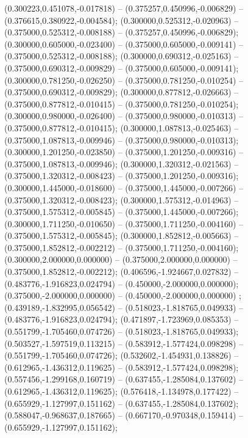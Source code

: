  (0.300223,0.451078,-0.017818) -- (0.375257,0.450996,-0.006829) -- (0.376615,0.380922,-0.004584);
 (0.300000,0.525312,-0.020963) -- (0.375000,0.525312,-0.008188) -- (0.375257,0.450996,-0.006829);
 (0.300000,0.605000,-0.023400) -- (0.375000,0.605000,-0.009141) -- (0.375000,0.525312,-0.008188);
 (0.300000,0.690312,-0.025163) -- (0.375000,0.690312,-0.009829) -- (0.375000,0.605000,-0.009141);
 (0.300000,0.781250,-0.026250) -- (0.375000,0.781250,-0.010254) -- (0.375000,0.690312,-0.009829);
 (0.300000,0.877812,-0.026663) -- (0.375000,0.877812,-0.010415) -- (0.375000,0.781250,-0.010254);
 (0.300000,0.980000,-0.026400) -- (0.375000,0.980000,-0.010313) -- (0.375000,0.877812,-0.010415);
 (0.300000,1.087813,-0.025463) -- (0.375000,1.087813,-0.009946) -- (0.375000,0.980000,-0.010313);
 (0.300000,1.201250,-0.023850) -- (0.375000,1.201250,-0.009316) -- (0.375000,1.087813,-0.009946);
 (0.300000,1.320312,-0.021563) -- (0.375000,1.320312,-0.008423) -- (0.375000,1.201250,-0.009316);
 (0.300000,1.445000,-0.018600) -- (0.375000,1.445000,-0.007266) -- (0.375000,1.320312,-0.008423);
 (0.300000,1.575312,-0.014963) -- (0.375000,1.575312,-0.005845) -- (0.375000,1.445000,-0.007266);
 (0.300000,1.711250,-0.010650) -- (0.375000,1.711250,-0.004160) -- (0.375000,1.575312,-0.005845);
 (0.300000,1.852812,-0.005663) -- (0.375000,1.852812,-0.002212) -- (0.375000,1.711250,-0.004160);
 (0.300000,2.000000,0.000000) -- (0.375000,2.000000,0.000000) -- (0.375000,1.852812,-0.002212);
 (0.406596,-1.924667,0.027832) -- (0.483776,-1.916823,0.024794) -- (0.450000,-2.000000,0.000000);
 (0.375000,-2.000000,0.000000) -- (0.450000,-2.000000,0.000000) ;
 (0.439189,-1.832995,0.056542) -- (0.518023,-1.818765,0.049933) -- (0.483776,-1.916823,0.024794);
 (0.471897,-1.723969,0.085353) -- (0.551799,-1.705460,0.074726) -- (0.518023,-1.818765,0.049933);
 (0.503527,-1.597519,0.113215) -- (0.583912,-1.577424,0.098298) -- (0.551799,-1.705460,0.074726);
 (0.532602,-1.454931,0.138826) -- (0.612965,-1.436312,0.119625) -- (0.583912,-1.577424,0.098298);
 (0.557456,-1.299168,0.160719) -- (0.637455,-1.285084,0.137602) -- (0.612965,-1.436312,0.119625);
 (0.576418,-1.134978,0.177422) -- (0.655929,-1.127997,0.151162) -- (0.637455,-1.285084,0.137602);
 (0.588047,-0.968637,0.187665) -- (0.667170,-0.970348,0.159414) -- (0.655929,-1.127997,0.151162);

